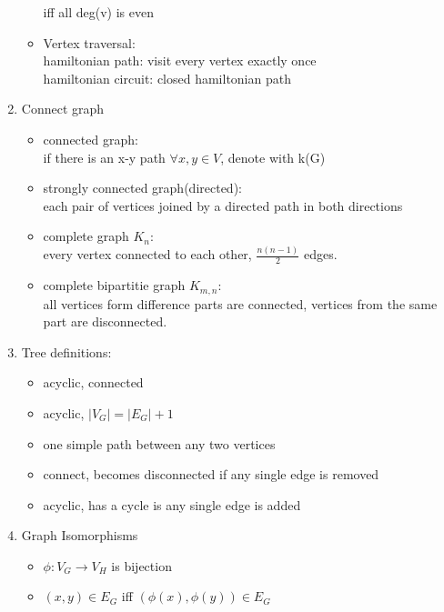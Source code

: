 \documentclass[11pt, a4paper]{article}
\begin{document}
\begin{multicols}{3}
\begin{enumerate}
\begin{itemize}
                    iff all deg(v) is even
                \item Vertex traversal:\\
                    hamiltonian path: visit every vertex exactly once\\
                    hamiltonian circuit: closed hamiltonian path
            \end{itemize}
        \item Connect graph
            \begin{itemize}
                \item connected graph:\\
                    if there is an x-y path $\forall x,y \in V$, denote with k(G)
                \item strongly connected graph(directed):\\
                    each pair of vertices joined by a directed path in both directions
                \item complete graph $K_n$:\\
                    every vertex connected to each other, $\frac {n(n-1)}{2}$ edges.
                \item complete bipartitie graph $K_{m,n}$:\\
                    all vertices form difference parts are connected, vertices from the same part are disconnected.
            \end{itemize}
        \item Tree definitions:
            \begin{itemize}
                \item acyclic, connected
                \item acyclic, $|V_G| = |E_G| + 1$
                \item one simple path between any two vertices
                \item connect, becomes disconnected if any single edge is removed
                \item acyclic, has a cycle is any single edge is added
            \end{itemize}
        \item Graph Isomorphisms
            \begin{itemize}
                \item $ \phi: V_G \rightarrow V_H$ is bijection
                \item $ (x,y) \in E_G$ iff $(\phi(x), \phi(y)) \in E_G$
            \end{itemize}

\end{enumerate}
\end{multicols}
\end{document}
